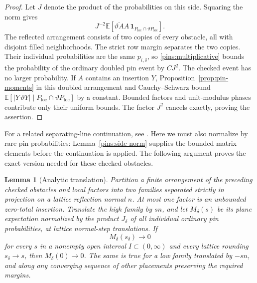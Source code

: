 \documentclass[11pt]{article}
\newcommand{\E}{\mathbb E}
\newcommand{\ind}{\mathbf 1}
\newtheorem{lemma}[theorem]{Lemma}
\theoremstyle{definition}
\theoremstyle{remark}
\numberwithin{equation}{section}
\begin{document}
\begin{proof}
Let $J$ denote the product of the probabilities on this side.  Squaring
the norm gives
\[
 J^{-2}\E\left[\overline{\vartheta A}A\,
    \ind_{P_{\mathrm{loc}}\cap\vartheta P_{\mathrm{loc}}}\right].
\]
The reflected arrangement consists of two copies of every obstacle,
all with disjoint filled neighborhoods.  The strict row margin
separates the two copies.  Their individual probabilities are the
same $p_{i,\delta}$, so \eqref{pins:multiplicative} bounds the
probability of the ordinary doubled pin event by $CJ^2$.
The checked event has no larger probability.  If $A$ contains an
insertion $Y$, Proposition~\ref{prop:pin-moments} in this doubled
arrangement and Cauchy--Schwarz bound
$\E[|Y\,\vartheta Y|\mid P_{\mathrm{loc}}\cap
\vartheta P_{\mathrm{loc}}]$ by a constant.  Bounded factors and
unit-modulus phases contribute only their uniform bounds.  The
factor $J^2$ cancels exactly, proving the assertion.
\end{proof}

For a related separating-line continuation, see
\cite[Section~7.1, Lemma~7.4]{DCKLM2026}.
Here we must also normalize by rare pin probabilities:
Lemma~\ref{pins:side-norm} supplies the bounded matrix elements before
the continuation is applied.  The following argument proves the exact
version needed for these checked obstacles.

\begin{lemma}[Analytic translation]\label{lem:analytic-translation}
Partition a finite arrangement of the preceding checked obstacles and
local factors into two families separated strictly in projection on a
lattice reflection normal $n$.  At most one factor is an unbounded
zero-total insertion.  Translate the high family by $sn$, and let
$M_\delta(s)$ be its plane expectation normalized by the product
$J_\delta$ of all individual ordinary pin probabilities, at lattice
normal-step translations.  If
\[
 M_\delta(s_\delta)\longrightarrow0
\]
for every $s$ in a nonempty open interval $I\subset(0,\infty)$ and
every lattice rounding $s_\delta\to s$, then $M_\delta(0)\to0$.
The same is true for a low family translated by $-sn$, and along any
converging sequence of other placements preserving the required margins.
\end{lemma}
\end{document}
